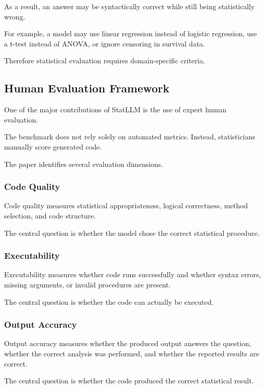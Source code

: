 \documentclass[11pt]{article}
\begin{document}
As a result, an answer may be syntactically correct while still being statistically wrong.

For example, a model may use linear regression instead of logistic regression, use a t-test instead of ANOVA, or ignore censoring in survival data.

Therefore statistical evaluation requires domain-specific criteria.

\subsection*{Human Evaluation Framework}

One of the major contributions of StatLLM is the use of expert human evaluation.

The benchmark does not rely solely on automated metrics. Instead, statisticians manually score generated code.

The paper identifies several evaluation dimensions.

\subsubsection*{Code Quality}

Code quality measures statistical appropriateness, logical correctness, method selection, and code structure.

The central question is whether the model chose the correct statistical procedure.

\subsubsection*{Executability}

Executability measures whether code runs successfully and whether syntax errors, missing arguments, or invalid procedures are present.

The central question is whether the code can actually be executed.

\subsubsection*{Output Accuracy}

Output accuracy measures whether the produced output answers the question, whether the correct analysis was performed, and whether the reported results are correct.

The central question is whether the code produced the correct statistical result.
\end{document}
